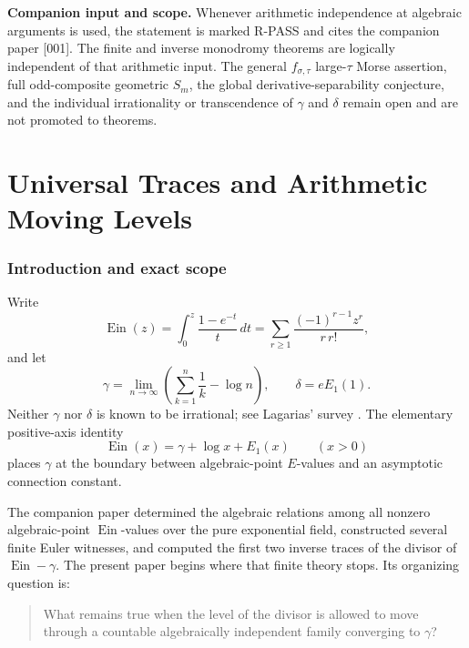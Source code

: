 \documentclass[11pt]{article}
\theoremstyle{keio}
\theoremstyle{definition}
\theoremstyle{remark}
\newcommand{\Ein}{\operatorname{Ein}}
\newcommand{\RPASS}{\textcolor{keioxblue}{\textsf{R-PASS}}}
\begin{document}
\begin{notebox}
\textbf{Companion input and scope.}
Whenever arithmetic independence at algebraic arguments is used, the statement
is marked \RPASS{} and cites the companion paper [001].  The finite and inverse
monodromy theorems are logically independent of that arithmetic input.  The
general \(f_{\sigma,\tau}\) large-\(\tau\) Morse assertion, full odd-composite
geometric \(S_m\), the global derivative-separability conjecture, and the
individual irrationality or transcendence of \(\gamma\) and \(\delta\) remain
open and are not promoted to theorems.
\end{notebox}

\tableofcontents
\newpage
{}

\part{Universal Traces and Arithmetic Moving Levels}
\section{Introduction and exact scope}

Write
\[
 \Ein(z)=\int_0^z\frac{1-e^{-t}}t\,dt
 =\sum_{r\ge1}\frac{(-1)^{r-1}z^r}{r\,r!},
\]
and let
\[
 \gamma=\lim_{n\to\infty}\left(\sum_{k=1}^n\frac1k-\log n\right),
 \qquad
 \delta=eE_1(1).
\]
Neither \(\gamma\) nor \(\delta\) is known to be irrational; see
Lagarias' survey \cite{Lagarias2013}.  The elementary positive-axis identity
\begin{equation}\label{eq:Ein-connection}
 \Ein(x)=\gamma+\log x+E_1(x)\qquad(x>0)
\end{equation}
places \(\gamma\) at the boundary between algebraic-point \(E\)-values and an
asymptotic connection constant.

The companion paper \cite{KEIO2026I} determined the algebraic relations among
all nonzero algebraic-point \(\Ein\)-values over the pure exponential field,
constructed several finite Euler witnesses, and computed the first two
inverse traces of the divisor of \(\Ein-\gamma\).  The present paper begins
where that finite theory stops.  Its organizing question is:
\begin{quote}
What remains true when the level of the divisor is allowed to move through a
countable algebraically independent family converging to \(\gamma\)?
\end{quote}
\end{document}
